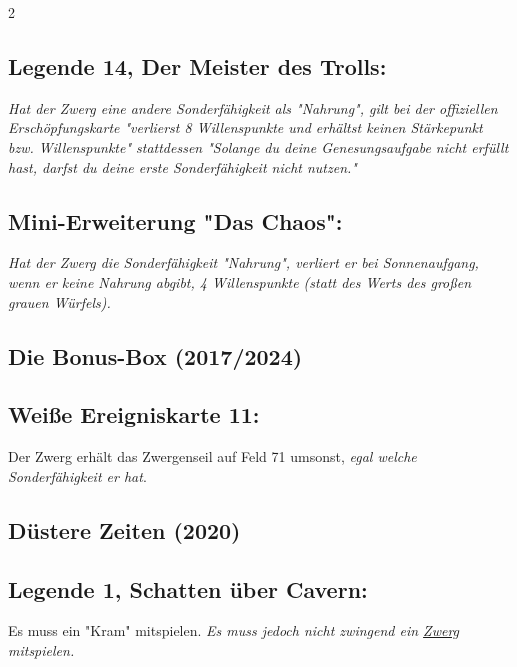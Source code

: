 \documentclass[10pt, a4paper, oneside]{book}
\newcommand{\fan}[1]{\textit{#1}}
\begin{document}
\begin{multicols*}{2}
\begin{bgcolor}
\subsection{Legende 14, Der Meister des Trolls:}

\fan{Hat der Zwerg eine andere Sonderfähigkeit als "Nahrung", gilt bei der offiziellen Erschöpfungskarte "verlierst 8 Willenspunkte und erhältst keinen Stärkepunkt bzw. Willenspunkte" stattdessen "Solange du deine Genesungsaufgabe nicht erfüllt hast, darfst du deine erste Sonderfähigkeit nicht nutzen."}


\subsection{Mini-Erweiterung "Das Chaos":}

\fan{Hat der Zwerg die Sonderfähigkeit "Nahrung", verliert er bei Sonnenaufgang, wenn er keine Nahrung abgibt, 4 Willenspunkte (statt des Werts des großen grauen Würfels).}

\end{bgcolor}




\begin{bgcolor}[color-BB]
\section{Die Bonus-Box (2017/2024)}

\subsection{Weiße Ereigniskarte 11:}

Der Zwerg erhält das Zwergenseil auf Feld 71 umsonst, 
\supercite{BB:Ereigniskarte_11}
\fan{egal welche Sonderfähigkeit er hat}.

\end{bgcolor}


\begin{bgcolor}[color-DZ]
\section{Düstere Zeiten (2020)}

\subsection{Legende 1, Schatten über Cavern:}

Es muss ein "Kram" mitspielen.
\supercite{DZ:Begleitheft}
\fan{Es muss jedoch nicht zwingend ein \hyperref[Zwerg]{Zwerg} mitspielen.} 


\end{bgcolor}
\end{multicols*}
\end{document}
